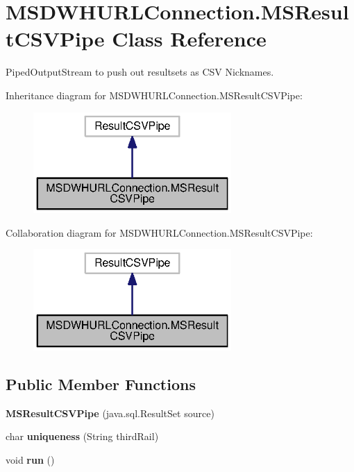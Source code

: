 \section{M\+S\+D\+W\+H\+U\+R\+L\+Connection.\+M\+S\+Result\+C\+S\+V\+Pipe Class Reference}
\label{classorg_1_1smallfoot_1_1parser_1_1msosmsql_1_1MSDWHURLConnection_1_1MSResultCSVPipe}


Piped\+Output\+Stream to push out resultsets as C\+S\+V Nicknames.  




Inheritance diagram for M\+S\+D\+W\+H\+U\+R\+L\+Connection.\+M\+S\+Result\+C\+S\+V\+Pipe\+:\nopagebreak
\begin{figure}[H]
\begin{center}
\leavevmode
\includegraphics[width=214pt]{classorg_1_1smallfoot_1_1parser_1_1msosmsql_1_1MSDWHURLConnection_1_1MSResultCSVPipe__inherit__graph}
\end{center}
\end{figure}


Collaboration diagram for M\+S\+D\+W\+H\+U\+R\+L\+Connection.\+M\+S\+Result\+C\+S\+V\+Pipe\+:\nopagebreak
\begin{figure}[H]
\begin{center}
\leavevmode
\includegraphics[width=214pt]{classorg_1_1smallfoot_1_1parser_1_1msosmsql_1_1MSDWHURLConnection_1_1MSResultCSVPipe__coll__graph}
\end{center}
\end{figure}
\subsection*{Public Member Functions}
\begin{DoxyCompactItemize}
\item 
{\bf M\+S\+Result\+C\+S\+V\+Pipe} (java.\+sql.\+Result\+Set source)
\item 
char {\bf uniqueness} (String third\+Rail)
\item 
void {\bf run} ()
\end{DoxyCompactItemize}



